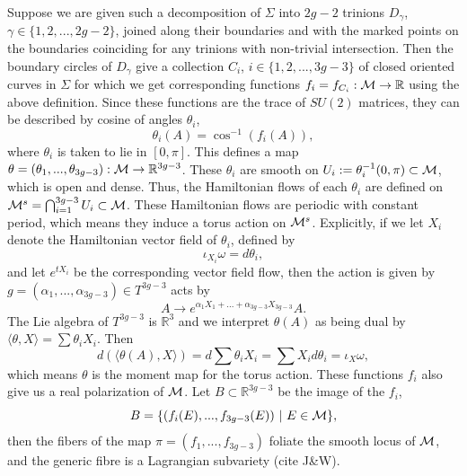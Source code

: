 	Suppose we are given such a decomposition of $\Sigma$ into $2g-2$ trinions $D_\gamma$, $\gamma\in\{1,2,...,2g-2\}$, joined along their boundaries and with the marked points on the boundaries coinciding for any trinions with non-trivial intersection. Then the boundary circles of $D_\gamma$ give a collection $C_i$, $i\in\{1,2,...,3g-3\}$ of closed oriented curves in $\Sigma$ for which we get corresponding functions $f_i = f_{C_i}:\mathcal{M} \to \mathbb{R}$ using the above definition. Since these functions are the trace of $SU(2)$ matrices, they can be described by cosine of angles $\theta_i$,
	\begin{equation}
		\theta_i(A) = \cos^{-1}(f_i(A)),
	\end{equation}
	where $\theta_i$ is taken to lie in $[0,\pi]$. This defines a map $\theta = (\theta_1,...,\theta_{3g-3}):\mathcal{M} \to \mathbb{R}^{3g-3}$. These $\theta_i$ are smooth on $U_i := \theta_i^{-1}(0,\pi) \subset \mathcal{M}$, which is open and dense. Thus, the Hamiltonian flows of each $\theta_i$ are defined on $\mathcal{M}^{s} = \bigcap_{i=1}^{3g-3} U_i \subset \mathcal{M}$. These Hamiltonian flows are periodic with constant period, which means they induce a torus action on $\mathcal{M}^{s}$. Explicitly, if we let $X_i$ denote the Hamiltonian vector field of $\theta_i$, defined by
	\begin{equation}
		\iota_{X_i}\omega = d\theta_i,
	\end{equation}
	and let $e^{tX_i}$ be the corresponding vector field flow, then the action is given by $g = (\alpha_1,...,\alpha_{3g-3}) \in T^{3g-3}$ acts by
	\begin{equation}
		A \to e^{\alpha_1 X_1 + ... + \alpha_{3g-3}X_{3g-3}}A.
	\end{equation}
	 The Lie algebra of $T^{3g-3}$ is $
	\mathbb{R}^3$ and we interpret $\theta(A)$ as being dual by $\langle \theta, X \rangle = \sum \theta_i X_i$. Then
	\begin{equation}
		d\left(\langle \theta(A),X\rangle\right) = d\sum\theta_i X_i = \sum X_i d\theta_i = \iota_{X}\omega,
	\end{equation}
	which means $\theta$ is the moment map for the torus action. These functions $f_i$ also give us a real polarization of $\mathcal{M}$. Let $B \subset \mathbb{R}^{3g-3}$ be the image of the $f_i$,
	\begin{equation}
		B = \{(f_i(E),...,f_{3g-3}(E))~|~ E \in \mathcal{M}\},
		\label{e:B-def}
	\end{equation}
	then the fibers of the map $\pi = (f_1,...,f_{3g-3})$ foliate the smooth locus of $\mathcal{M}$, and the generic fibre is a Lagrangian subvariety (cite J\&W). 
	
